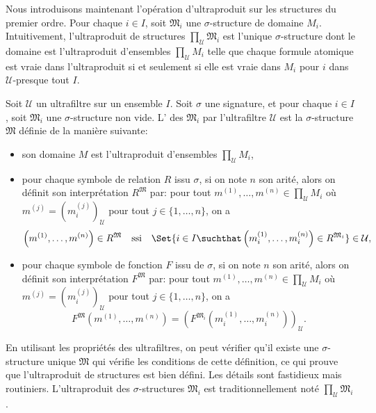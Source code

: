 Nous introduisons maintenant l'opération d'ultraproduit sur les structures du premier ordre. Pour chaque $i\in I$, soit $\mathfrak{M}_{i}$ une $\sigma$-structure de domaine $M_{i}$. Intuitivement, l'ultraproduit de structures $\prod_{\mathcal{U}}\mathfrak{M}_{i}$ est l'unique $\sigma$-structure dont le domaine est l'ultraproduit d'ensembles $\prod_{\mathcal{U}}M_{i}$ telle que chaque formule atomique est vraie dans l'ultraproduit si et seulement si elle est vraie dans $M_{i}$ pour $i$ dans $\mathcal{U}$-presque tout $I$.

\begin{definition}
	Soit $\mathcal{U}$ un ultrafiltre sur un ensemble $I$. Soit $\sigma$ une signature, et pour chaque $i\in I$, soit $\mathfrak{M}_{i}$ une $\sigma$-structure non vide. L' des $\mathfrak{M}_{i}$ par l'ultrafiltre $\mathcal{U}$ est la $\sigma$-structure $\mathfrak{M}$ définie de la manière suivante:
	\begin{itemize}
		\item son domaine $M$ est l'ultraproduit d'ensembles $\prod_{\mathcal{U}}M_{i}$,
		\item pour chaque symbole de relation $R$ issu $\sigma$, si on note $n$ son arité, alors on définit son interprétation $R^{\mathfrak{M}}$ par: pour tout $m^{\left(1\right)},\dots,m^{\left(n\right)}\in\prod_{\mathcal{U}}M_{i}$ où $m^{\left(j\right)}=\left(m_{i}^{\left(j\right)}\right)_{\mathcal{U}}$ pour tout $j\in\{1,\dots,n\}$, on a
		\[
			\left(m^{\left(1\right)},\dots,m^{\left(n\right)}\right)\in R^{\mathfrak{M}}\quad\text{ssi}\quad\Set{i\in I\suchthat \left(m_{i}^{\left(1\right)},\dots,m_{i}^{\left(n\right)}\right)\in R^{\mathfrak{M}_{i}}}\in\mathcal{U},
		\]
		\item pour chaque symbole de fonction $F$ issu de $\sigma$, si on note $n$ son arité, alors on définit son interprétation $F^{\mathfrak{M}}$ par: pour tout $m^{\left(1\right)},\dots,m^{\left(n\right)}\in\prod_{\mathcal{U}}M_{i}$ où $m^{\left(j\right)}=\left(m_{i}^{\left(j\right)}\right)_{\mathcal{U}}$ pour tout $j\in\{1,\dots,n\}$, on a
		\[
			F^{\mathfrak{M}}\left(m^{\left(1\right)},\dots,m^{\left(n\right)}\right)=\left(F^{\mathfrak{M}_{i}}\left(m_{i}^{\left(1\right)},\dots,m_{i}^{\left(n\right)}\right)\right)_{\mathcal{U}}.
		\]
	\end{itemize}
\end{definition}

En utilisant les propriétés des ultrafiltres, on peut vérifier qu'il existe une $\sigma$-structure unique $\mathfrak{M}$ qui vérifie les conditions de cette définition, ce qui prouve que l'ultraproduit de structures est bien défini. Les détails sont fastidieux mais routiniers. L'ultraproduit des $\sigma$-structures $\mathfrak{M}_{i}$ est traditionnellement noté $\prod_{\mathcal{U}}\mathfrak{M}_{i}$.

